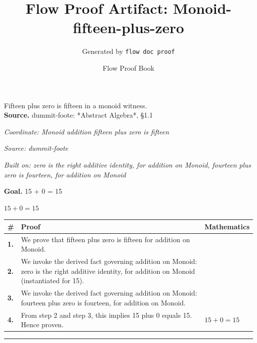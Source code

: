 \documentclass[11pt]{article}
\title{Flow Proof Artifact: Monoid-fifteen-plus-zero}
\author{Generated by \texttt{flow doc proof}}
\date{Flow Proof Book}
\theoremstyle{definition}
\begin{document}
\maketitle
Fifteen plus zero is fifteen in a monoid witness.\\[0.5em]
\textbf{Source.} dummit-foote: *Abstract Algebra*, §1.1\\[0.5em]
\bigskip
{}\par
\smallskip\noindent\textit{Coordinate: Monoid \cdot addition \cdot fifteen plus zero is fifteen}\par
\smallskip\noindent\textit{Source: dummit-foote}\par
\smallskip\noindent\textit{Built on: zero is the right additive identity, for addition on Monoid, fourteen plus zero is fourteen, for addition on Monoid}\par
\medskip
\noindent\textbf{Goal.} 15 + 0 = 15\par
\noindent$\displaystyle 15 + 0 = 15$\par
\medskip
\noindent
\begin{tabular}{@{} >{\raggedright\arraybackslash}p{} >{\raggedright\arraybackslash}p{} >{\raggedleft\arraybackslash}p{} @{}}
\textbf{\#} & \textbf{Proof} & \textbf{Mathematics} \\
\midrule
\textbf{1.} & We prove that fifteen plus zero is fifteen for addition on Monoid. & \\[0.45em]
\textbf{2.} & We invoke the derived fact governing addition on Monoid: zero is the right additive identity, for addition on Monoid (instantiated for 15). & \\[0.45em]
\textbf{3.} & We invoke the derived fact governing addition on Monoid: fourteen plus zero is fourteen, for addition on Monoid. & \\[0.45em]
\textbf{4.} & From step 2 and step 3, this implies 15 plus 0 equals 15. Hence proven. & $\displaystyle 15 + 0 = 15$ \\[0.45em]
\bottomrule
\end{tabular}
\label{thm:Monoid-addition-fifteen_plus_zero_is_fifteen}
\par\medskip\hrule
\end{document}
